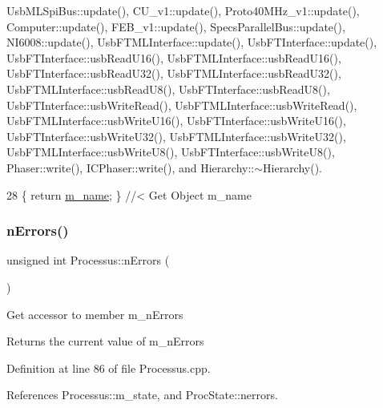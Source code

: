 Usb\+M\+L\+Spi\+Bus\+::update(), C\+U\+\_\+v1\+::update(), Proto40\+M\+Hz\+\_\+v1\+::update(), Computer\+::update(), F\+E\+B\+\_\+v1\+::update(), Specs\+Parallel\+Bus\+::update(), N\+I6008\+::update(), Usb\+F\+T\+M\+L\+Interface\+::update(), Usb\+F\+T\+Interface\+::update(), Usb\+F\+T\+Interface\+::usb\+Read\+U16(), Usb\+F\+T\+M\+L\+Interface\+::usb\+Read\+U16(), Usb\+F\+T\+Interface\+::usb\+Read\+U32(), Usb\+F\+T\+M\+L\+Interface\+::usb\+Read\+U32(), Usb\+F\+T\+M\+L\+Interface\+::usb\+Read\+U8(), Usb\+F\+T\+Interface\+::usb\+Read\+U8(), Usb\+F\+T\+Interface\+::usb\+Write\+Read(), Usb\+F\+T\+M\+L\+Interface\+::usb\+Write\+Read(), Usb\+F\+T\+M\+L\+Interface\+::usb\+Write\+U16(), Usb\+F\+T\+Interface\+::usb\+Write\+U16(), Usb\+F\+T\+Interface\+::usb\+Write\+U32(), Usb\+F\+T\+M\+L\+Interface\+::usb\+Write\+U32(), Usb\+F\+T\+M\+L\+Interface\+::usb\+Write\+U8(), Usb\+F\+T\+Interface\+::usb\+Write\+U8(), Phaser\+::write(), I\+C\+Phaser\+::write(), and Hierarchy\+::$\sim$\+Hierarchy().


\begin{DoxyCode}
28 \{ \textcolor{keywordflow}{return} \hyperlink{classObject_a8b83c95c705d2c3ba0d081fe1710f48d}{m\_name}; \} \textcolor{comment}{//< Get Object m\_name}
\end{DoxyCode}
\mbox{\label{classProcessus_a82a0487f82f07cc2c2dc2731f98149e7}} 
\subsubsection{\texorpdfstring{n\+Errors()}{nErrors()}}
{\footnotesize\ttfamily unsigned int Processus\+::n\+Errors (\begin{DoxyParamCaption}{ }\end{DoxyParamCaption})\hspace{0.3cm}{\ttfamily [inherited]}}

Get accessor to member m\+\_\+n\+Errors \begin{DoxyReturn}{Returns}
the current value of m\+\_\+n\+Errors 
\end{DoxyReturn}


Definition at line 86 of file Processus.\+cpp.



References Processus\+::m\+\_\+state, and Proc\+State\+::nerrors.



